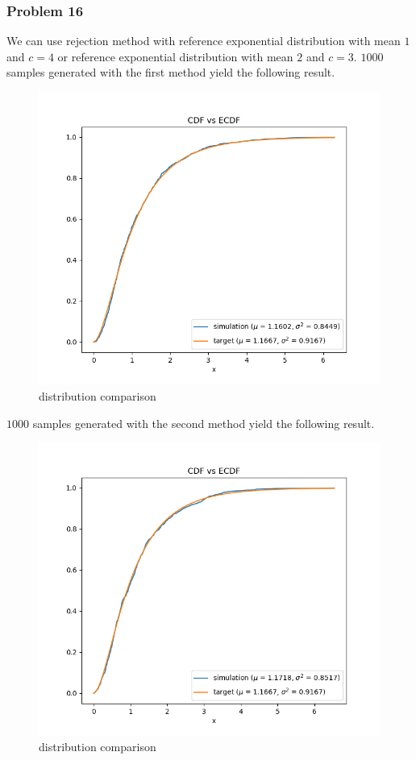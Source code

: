 \documentclass{article}
\begin{document}
\subsubsection*{Problem 16}
We can use rejection method with reference exponential distribution with mean $1$ and $c=4$ or reference exponential distribution with mean $2$ and $c=3$. $1000$ samples generated with the first method yield the following result.
\newpage
\begin{figure}[h!]
    \centering
    \includegraphics[width=\linewidth]{../images/p16_1_1000.png}
    \caption{distribution comparison}
\end{figure}
\newpage
$1000$ samples generated with the second method yield the following result.
\begin{figure}[h!]
    \centering
    \includegraphics[width=\linewidth]{../images/p16_2_1000.png}
    \caption{distribution comparison}
\end{figure}
\newpage
\end{document}
